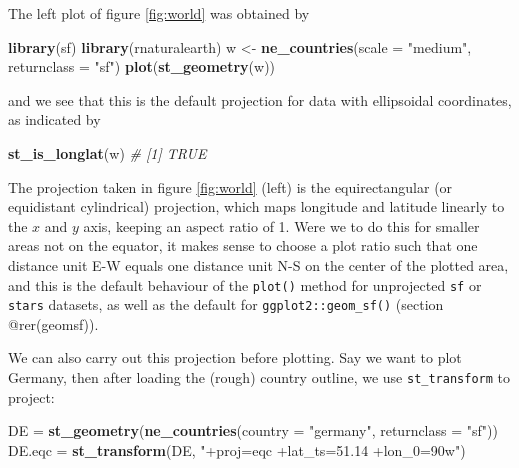 \documentclass[]{book}
\newenvironment{Shaded}{\begin{snugshade}}{\end{snugshade}}
\newcommand{\CommentTok}[1]{\textcolor[rgb]{0.56,0.35,0.01}{\textit{#1}}}
\newcommand{\DataTypeTok}[1]{\textcolor[rgb]{0.13,0.29,0.53}{#1}}
\newcommand{\KeywordTok}[1]{\textcolor[rgb]{0.13,0.29,0.53}{\textbf{#1}}}
\newcommand{\NormalTok}[1]{#1}
\newcommand{\StringTok}[1]{\textcolor[rgb]{0.31,0.60,0.02}{#1}}
\begin{document}
The left plot of figure \ref{fig:world} was obtained by

\begin{Shaded}
\begin{Highlighting}[]
\KeywordTok{library}\NormalTok{(sf)}
\KeywordTok{library}\NormalTok{(rnaturalearth)}
\NormalTok{w <-}\StringTok{ }\KeywordTok{ne_countries}\NormalTok{(}\DataTypeTok{scale =} \StringTok{"medium"}\NormalTok{, }\DataTypeTok{returnclass =} \StringTok{"sf"}\NormalTok{)}
\KeywordTok{plot}\NormalTok{(}\KeywordTok{st_geometry}\NormalTok{(w))}
\end{Highlighting}
\end{Shaded}

and we see that this is the default projection for data with ellipsoidal coordinates, as indicated by

\begin{Shaded}
\begin{Highlighting}[]
\KeywordTok{st_is_longlat}\NormalTok{(w)}
\CommentTok{# [1] TRUE}
\end{Highlighting}
\end{Shaded}

The projection taken in figure \ref{fig:world} (left) is the
equirectangular (or equidistant cylindrical) projection, which maps
longitude and latitude linearly to the \(x\) and \(y\) axis, keeping
an aspect ratio of 1. Were we to do this for smaller areas not on
the equator, it makes sense to choose a plot ratio such that one
distance unit E-W equals one distance unit N-S on the center of
the plotted area, and this is the default behaviour of the \texttt{plot()}
method for unprojected \texttt{sf} or \texttt{stars} datasets, as well as the
default for \texttt{ggplot2::geom\_sf()} (section @rer(geomsf)).

We can also carry out this projection before plotting. Say we want to
plot Germany, then after loading the (rough) country outline,
we use \texttt{st\_transform} to project:

\begin{Shaded}
\begin{Highlighting}[]
\NormalTok{DE =}\StringTok{ }\KeywordTok{st_geometry}\NormalTok{(}\KeywordTok{ne_countries}\NormalTok{(}\DataTypeTok{country =} \StringTok{"germany"}\NormalTok{, }\DataTypeTok{returnclass =} \StringTok{"sf"}\NormalTok{))}
\NormalTok{DE.eqc =}\StringTok{ }\KeywordTok{st_transform}\NormalTok{(DE, }\StringTok{"+proj=eqc +lat_ts=51.14 +lon_0=90w"}\NormalTok{)}
\end{Highlighting}
\end{Shaded}
\end{document}
